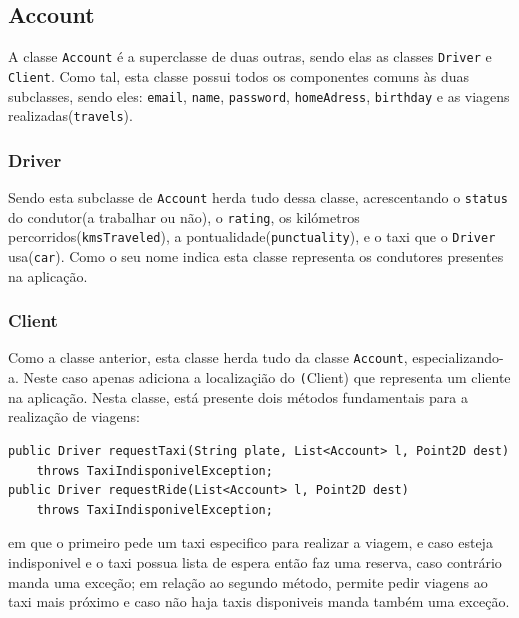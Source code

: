\documentclass[a4paper,10pt,portuguese]{article}
\begin{document}
\subsection{Account}
A classe \texttt{Account} é a superclasse de duas outras, sendo elas as classes \texttt{Driver} e \texttt{Client}. Como tal, esta classe possui todos os componentes comuns às duas subclasses, sendo eles: \texttt{email}, \texttt{name}, \texttt{password}, \texttt{homeAdress}, \texttt{birthday} e as viagens realizadas(\texttt{travels}).

\subsubsection{Driver}
Sendo esta subclasse de \texttt{Account} herda tudo dessa classe, acrescentando o \texttt{status} do condutor(a trabalhar ou não), o \texttt{rating}, os kilómetros percorridos(\texttt{kmsTraveled}), a pontualidade(\texttt{punctuality}), e o taxi que o \texttt{Driver} usa(\texttt{car}). Como o seu nome indica esta classe representa os condutores presentes na aplicação.

\subsubsection{Client}
Como a classe anterior, esta classe herda tudo da classe \texttt{Account}, especializando-a. Neste caso apenas adiciona a localizaçião do \texttt(Client) que representa um cliente na aplicação. Nesta classe, está presente dois métodos fundamentais para a realização de viagens:
\begin{verbatim}
public Driver requestTaxi(String plate, List<Account> l, Point2D dest) 
    throws TaxiIndisponivelException;
public Driver requestRide(List<Account> l, Point2D dest) 
    throws TaxiIndisponivelException;
\end{verbatim}
em que o primeiro pede um taxi especifico para realizar a viagem, e caso esteja indisponivel e o taxi possua lista de espera então faz uma reserva, caso contrário manda uma exceção; em relação ao segundo método, permite pedir viagens ao taxi mais próximo e caso não haja taxis disponiveis manda também uma exceção. 
\end{document}
